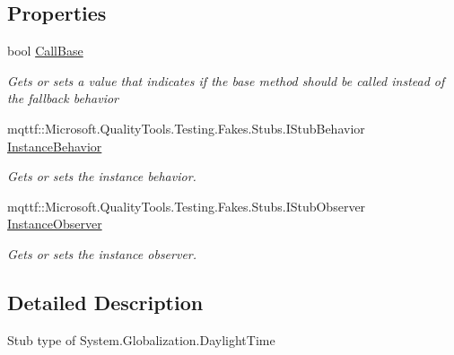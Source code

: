 \subsection*{Properties}
\begin{DoxyCompactItemize}
\item 
bool \hyperlink{class_system_1_1_globalization_1_1_fakes_1_1_stub_daylight_time_ad22e6f5031b2e534b63b7c1967c95e2d}{Call\-Base}
\begin{DoxyCompactList}\small\item\em Gets or sets a value that indicates if the base method should be called instead of the fallback behavior\end{DoxyCompactList}\item 
mqttf\-::\-Microsoft.\-Quality\-Tools.\-Testing.\-Fakes.\-Stubs.\-I\-Stub\-Behavior \hyperlink{class_system_1_1_globalization_1_1_fakes_1_1_stub_daylight_time_a5986bb5db0c6c01b2e9795787b86f257}{Instance\-Behavior}
\begin{DoxyCompactList}\small\item\em Gets or sets the instance behavior.\end{DoxyCompactList}\item 
mqttf\-::\-Microsoft.\-Quality\-Tools.\-Testing.\-Fakes.\-Stubs.\-I\-Stub\-Observer \hyperlink{class_system_1_1_globalization_1_1_fakes_1_1_stub_daylight_time_ac676cb6e24eaef8da7e6872f5f9ded44}{Instance\-Observer}
\begin{DoxyCompactList}\small\item\em Gets or sets the instance observer.\end{DoxyCompactList}\end{DoxyCompactItemize}


\subsection{Detailed Description}
Stub type of System.\-Globalization.\-Daylight\-Time



